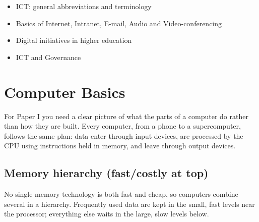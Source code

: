

\begin{sylbox}

\begin{itemize}
\tightlist
\item[$\square$]
  ICT: general abbreviations and terminology
\item[$\square$]
  Basics of Internet, Intranet, E-mail, Audio and Video-conferencing
\item[$\square$]
  Digital initiatives in higher education
\item[$\square$]
  ICT and Governance
\end{itemize}

\end{sylbox}

\needspace{125pt}

\hypertarget{p1-08--1-computer-basics}{%
\section{Computer Basics}\label{p1-08--1-computer-basics}}

For Paper I you need a clear picture of what the parts of a computer do rather than how they are built.
Every computer, from a phone to a supercomputer, follows the same plan: data enter through input devices,
are processed by the CPU using instructions held in memory, and leave through output devices.



\needspace{125pt}

\hypertarget{p1-08--memory-hierarchy-fastcostly-at-top}{%
\subsection{Memory hierarchy (fast/costly at top)}\label{p1-08--memory-hierarchy-fastcostly-at-top}}

No single memory technology is both fast and cheap, so computers combine several in a hierarchy. Frequently
used data are kept in the small, fast levels near the processor; everything else waits in the large, slow
levels below.



\needspace{95pt}

